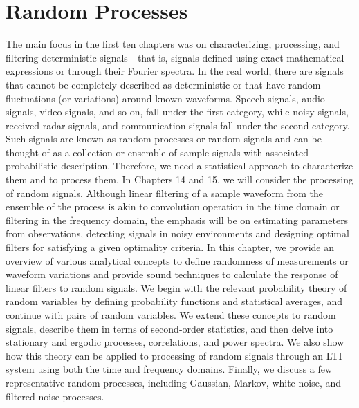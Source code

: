 \documentclass{article}
\begin{document}
\section{Random Processes}
The main focus in the first ten chapters was on characterizing, processing, and filtering deterministic signals—that is, signals defined using exact
mathematical expressions or through their Fourier spectra. In the real
world, there are signals that cannot be completely described as deterministic or that have random fluctuations (or variations) around known
waveforms. Speech signals, audio signals, video signals, and so on, fall
under the first category, while noisy signals, received radar signals, and
communication signals fall under the second category. Such signals are
known as random processes or random signals and can be thought of as a
collection or ensemble of sample signals with associated probabilistic description. Therefore, we need a statistical approach to characterize them
and to process them.
In Chapters 14 and 15, we will consider the processing of random
signals. Although linear filtering of a sample waveform from the ensemble
of the process is akin to convolution operation in the time domain or
filtering in the frequency domain, the emphasis will be on estimating
parameters from observations, detecting signals in noisy environments
and designing optimal filters for satisfying a given optimality criteria.
In this chapter, we provide an overview of various analytical concepts
to define randomness of measurements or waveform variations and provide sound techniques to calculate the response of linear filters to random
signals. We begin with the relevant probability theory of random variables by defining probability functions and statistical averages, and continue with pairs of random variables. We extend these concepts to random signals, describe them in terms of second-order statistics, and then delve
into stationary and ergodic processes, correlations, and power spectra.
We also show how this theory can be applied to processing of random signals through an LTI system using both the time and frequency domains.
Finally, we discuss a few representative random processes, including Gaussian, Markov, white noise, and filtered noise processes.
\end{document}
